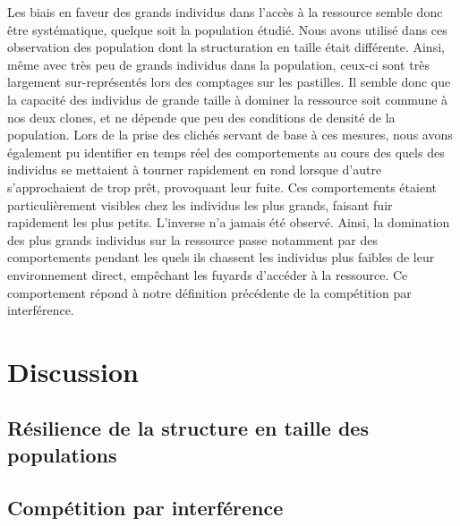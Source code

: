 Les biais en faveur des grands individus dans l'accès à la ressource semble donc
être systématique, quelque soit la population étudié. Nous avons utilisé dans
ces observation des population dont la structuration en taille était différente.
Ainsi, même avec très peu de grands individus dans la population, ceux-ci sont
très largement sur-représentés lors des comptages sur les pastilles. Il semble
donc que la capacité des individus de grande taille à dominer la ressource soit
commune à nos deux clones, et ne dépende que peu des conditions de densité de la
population. Lors de la prise des clichés servant de base à ces mesures, nous
avons également pu identifier en temps réel des comportements au cours des quels
des individus se mettaient à tourner rapidement en rond lorsque d'autre
s'approchaient de trop prêt, provoquant leur fuite. Ces comportements étaient
particulièrement visibles chez les individus les plus grands, faisant fuir
rapidement les plus petits. L'inverse n'a jamais été observé. Ainsi, la
domination des plus grands individus sur la ressource passe notamment par des
comportements pendant les quels ils chassent les individus plus faibles de leur
environnement direct, empêchant les fuyards d'accéder à la ressource. Ce
comportement répond à notre définition précédente de la compétition par
interférence. 

\section{Discussion}

\subsection{Résilience de la structure en taille des populations}

\subsection{Compétition par interférence}
